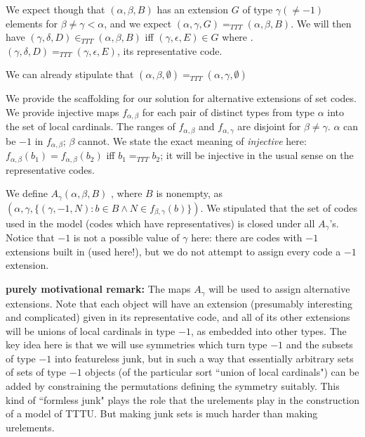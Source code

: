 \documentclass{slides}
\begin{document}
\begin{slide}

We expect though that $(\alpha,\beta,B)$ has an extension $G$ of type $\gamma(\neq -1)$ elements for $\beta\neq \gamma <\alpha$,
and we expect $(\alpha,\gamma,G) =_{TTT} (\alpha,\beta,B)$.  We will then have $(\gamma,\delta,D) \in_{TTT} (\alpha,\beta,B)$ iff $(\gamma,\epsilon,E)  \in G$ where .$(\gamma,\delta,D)=_{TTT} (\gamma,\epsilon,E)$, its representative code.

We can already stipulate that $(\alpha,\beta,\emptyset)=_{TTT}(\alpha,\gamma,\emptyset)$

We provide the scaffolding for our solution for alternative extensions of set codes.  We provide injective maps $f_{\alpha,\beta}$ for
each pair of distinct types from  type $\alpha$ into the set of local cardinals.  The ranges of $f_{\alpha,\beta}$ and $f_{\alpha,\gamma}$ are disjoint for $\beta\neq \gamma$.   $\alpha$ can be $-1$ in $f_{\alpha,\beta}$; $\beta$ cannot.
We state the exact meaning of {\em injective\/} here:  $f_{\alpha,\beta}(b_1) = f_{\alpha,\beta}(b_2)$ iff $b_1 =_{TTT} b_2$; it will be injective in the usual sense on the representative codes.

\end{slide}

\begin{slide}

We define $A_{\gamma}(\alpha,\beta,B)$ , where $B$ is nonempty, as $(\alpha,\gamma,\{(\gamma,-1,N):b \in B\wedge N \in f_{\beta,\gamma}(b)\})$.  We stipulated that the set of codes used in the model (codes which have representatives) is closed under all $A_\gamma$'s.  Notice
that $-1$ is not a possible value of $\gamma$ here:  there are codes with $-1$ extensions built in (used here!), but we do not attempt to assign every code a $-1$ extension.

{\bf purely motivational remark:}  The maps $A_\gamma$ will be used to assign alternative extensions.  Note that each object will have an extension (presumably interesting and complicated) given in its representative code, and all of its other extensions will be unions of local cardinals in type $-1$, as embedded into other types.  The key idea here is that we will use symmetries which turn type $-1$ and the subsets of type $-1$ into featureless junk, but in such a way that essentially arbitrary sets of sets of type $-1$ objects
(of the particular sort ``union of local cardinals") can be added by constraining the permutations defining the symmetry suitably.
This kind of ``formless junk" plays the role that the urelements play in the construction of a model of TTTU.  But making junk sets is much harder than making urelements.

\end{slide}
\end{document}
